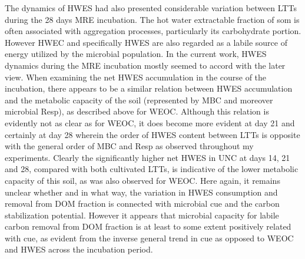 The dynamics of HWES had also presented considerable variation between LTTs during the 28 days MRE incubation. The hot water extractable fraction of \gls{som} is often associated with aggregation processes, particularly its carbohydrate portion.  However HWEC and specifically HWES are also regarded as a labile source of energy utilized by the microbial population. In the current work, HWES dynamics during the MRE incubation mostly seemed to accord with the later view. When examining the net HWES accumulation in the course of the incubation, there appears to be a similar relation between HWES accumulation and the metabolic capacity of the soil (represented by MBC and moreover microbial Resp), as described above for WEOC. Although this relation is evidently not as clear as for WEOC, it does become more evident at day 21 and certainly at day 28 wherein the order of HWES content between LTTs is opposite with the general order of MBC and Resp as observed throughout my experiments. Clearly the significantly higher net HWES in UNC at days 14, 21 and 28, compared with both cultivated LTTs, is indicative of the lower metabolic capacity of this soil, as was also observed for WEOC. Here again, it remains unclear whether and in what way, the variation in HWES consumption and removal from DOM fraction is connected with microbial \gls{cue} and the carbon stabilization potential. However it appears that microbial capacity for labile carbon removal from DOM fraction is at least to some extent positively related with \gls{cue}, as evident from the inverse general trend in \gls{cue} as opposed to WEOC and HWES across the incubation period.
